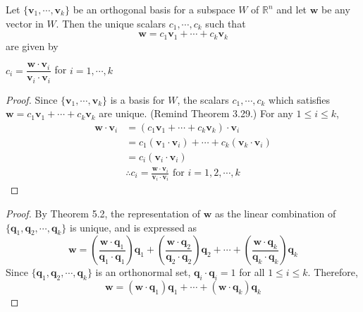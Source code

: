 \begin{theorem}
	Let $\{ \textbf{v}_1, \cdots, \textbf{v}_k \}$ be an orthogonal basis for a subspace $ W $ of $\mathbb{R}^n$ and let $ \textbf{w} $ be any vector in $ W $. Then the unique scalars $ c_{1},  \cdots, c_{k} $ such that
	$$ \textbf{w} = c_{1}\textbf{v}_{1} + \cdots +  c_{k}\textbf{v}_{k} $$
	are given by
	\begin{center}
		$c_{i}=\dfrac{\textbf{w}\cdot\textbf{v}_{i}}{\textbf{v}_{i}\cdot\textbf{v}_{i}} $ for $ i = 1, \cdots ,k $
	\end{center}
\end{theorem}
\begin{proof}
	Since $\{ \textbf{v}_1, \cdots, \textbf{v}_k \}$ is a basis for $W$, the scalars $c_1, \cdots, c_k$ which satisfies $\textbf{w} = c_1\textbf{v}_1 + \cdots + c_k\textbf{v}_k$ are unique. (Remind Theorem 3.29.) For any $1 \le i \le k$, \begin{align*}
		\textbf{w} \cdot \textbf{v}_i &= (c_1\textbf{v}_1 + \cdots + c_k\textbf{v}_k) \cdot \textbf{v}_i \\
		&= c_1(\textbf{v}_1 \cdot \textbf{v}_i) + \cdots + c_k(\textbf{v}_k \cdot \textbf{v}_i) \\
		&= c_i(\textbf{v}_i \cdot \textbf{v}_i) \\
		&\therefore c_i = \frac{\textbf{w} \cdot \textbf{v}_i}{\textbf{v}_i \cdot \textbf{v}_i} \mbox{ for } i = 1, 2, \cdots, k
	\end{align*}
\end{proof}

\begin{proof}
	By Theorem 5.2, the representation of $\textbf{w}$ as the linear combination of $\{\textbf{q}_1, \textbf{q}_2, \cdots, \textbf{q}_k \}$ is unique, and is expressed as \begin{equation*}
		\textbf{w} = \left ( \frac{\textbf{w}\cdot\textbf{q}_1}{\textbf{q}_1\cdot\textbf{q}_1} \right )\textbf{q}_1 + \left (\frac{\textbf{w}\cdot\textbf{q}_2}{\textbf{q}_2\cdot\textbf{q}_2} \right )\textbf{q}_2 + \cdots + \left (\frac{\textbf{w}\cdot\textbf{q}_k}{\textbf{q}_k\cdot\textbf{q}_k} \right )\textbf{q}_k
	\end{equation*} Since $\{\textbf{q}_1, \textbf{q}_2, \cdots, \textbf{q}_k \}$ is an orthonormal set, $\textbf{q}_i \cdot \textbf{q}_i = 1$ for all $1 \le i \le k$. Therefore, \begin{equation*}
		\textbf{w} = (\textbf{w}\cdot\textbf{q}_1)\textbf{q}_1 + \cdots + (\textbf{w}\cdot\textbf{q}_k)\textbf{q}_k
	\end{equation*}
\end{proof}

